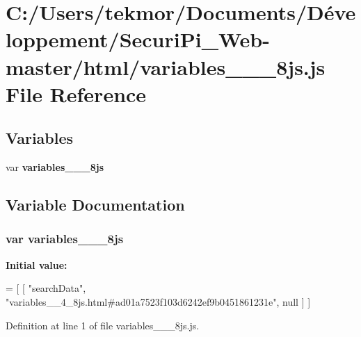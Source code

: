 \section{C\+:/\+Users/tekmor/\+Documents/\+Développement/\+Securi\+Pi\+\_\+\+Web-\/master/html/variables\+\_\+\+\_\+\_\+8js.js File Reference}
\label{variables____4__8js_8js}
\subsection*{Variables}
\begin{DoxyCompactItemize}
\item 
var {\bf variables\+\_\+\+\_\+\_\+8js}
\end{DoxyCompactItemize}


\subsection{Variable Documentation}
\subsubsection[{variables\+\_\+\+\_\+4\+\_\+8js}]{\setlength{\rightskip}{0pt plus 5cm}var variables\+\_\+\+\_\+\_\+8js}\label{variables____4__8js_8js_a6bf1be61301b2bddaae06950a9e49471}
{\bfseries Initial value\+:}
\begin{DoxyCode}
=
[
    [ \textcolor{stringliteral}{"searchData"}, \textcolor{stringliteral}{"variables\_\_4\_8js.html#ad01a7523f103d6242ef9b0451861231e"}, null ]
]
\end{DoxyCode}


Definition at line 1 of file variables\+\_\+\+\_\+\_\+8js.\+js.

